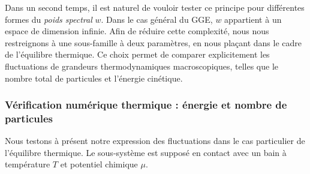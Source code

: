 
\medskip

Dans un second temps, il est naturel de vouloir tester ce principe pour différentes formes du {\em poids spectral} $w$. Dans le cas général du \gls{GGE}, $w$ appartient à un espace de dimension infinie. Afin de réduire cette complexité, nous nous restreignons à une sous-famille à deux paramètres, en nous plaçant dans le cadre de l’équilibre thermique. Ce choix permet de comparer explicitement les fluctuations de grandeurs thermodynamiques macroscopiques, telles que le nombre total de particules et l’énergie cinétique.





\subsubsection{Vérification numérique thermique :  énergie et nombre de particules}

Nous testons à présent notre expression des fluctuations dans le cas particulier de l'équilibre thermique. Le sous-système est supposé en contact avec un bain à température \( T \) et potentiel chimique \( \mu \).

